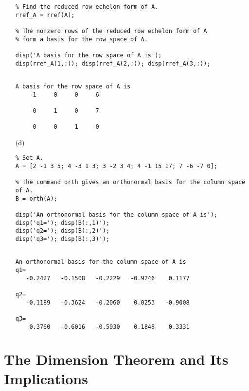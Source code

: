\begin{sol}
\begin{itemize}
\begin{verbatim}
% Find the reduced row echelon form of A.
rref_A = rref(A); 

% The nonzero rows of the reduced row echelon form of A
% form a basis for the row space of A.

disp('A basis for the row space of A is');
disp(rref_A(1,:)); disp(rref_A(2,:)); disp(rref_A(3,:));
\end{verbatim}

\begin{outputs}
\begin{verbatim}

A basis for the row space of A is
     1     0     0     6

     0     1     0     7

     0     0     1     0
\end{verbatim}
\end{outputs}

\item[(d)]

\begin{verbatim}
% Set A.
A = [2 -1 3 5; 4 -3 1 3; 3 -2 3 4; 4 -1 15 17; 7 -6 -7 0]; 

% The command orth gives an orthonormal basis for the column space of A.
B = orth(A);

disp('An orthonormal basis for the column space of A is');
disp('q1='); disp(B(:,1)');
disp('q2='); disp(B(:,2)');
disp('q3='); disp(B(:,3)');
\end{verbatim}

\begin{outputs}
\begin{verbatim}

An orthonormal basis for the column space of A is
q1=
   -0.2427   -0.1508   -0.2229   -0.9246    0.1177

q2=
   -0.1189   -0.3624   -0.2060    0.0253   -0.9008

q3=
    0.3760   -0.6016   -0.5930    0.1848    0.3331
\end{verbatim}
\end{outputs}
\end{itemize}
\end{sol}

\section{The Dimension Theorem and Its Implications}


